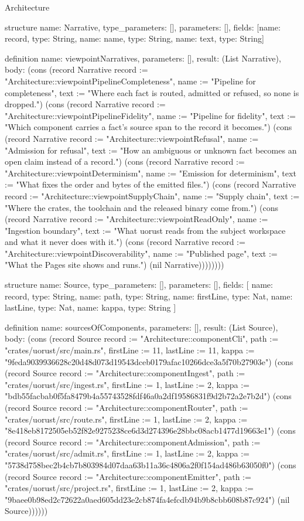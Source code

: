 \begin{lexlean}{Architecture}
\begin{semanticmodule}
structure{
  name: Narrative,
  type_parameters: [],
  parameters: [],
  fields: [{name: record, type: String}, {name: name, type: String}, {name: text, type: String}]
}

definition{
  name: viewpointNarratives,
  parameters: [],
  result: (List Narrative),
  body: (cons (record Narrative {record := "Architecture::viewpointPipelineCompleteness", name := "Pipeline for completeness", text := "Where each fact is routed, admitted or refused, so none is dropped."}) (cons (record Narrative {record := "Architecture::viewpointPipelineFidelity", name := "Pipeline for fidelity", text := "Which component carries a fact's source span to the record it becomes."}) (cons (record Narrative {record := "Architecture::viewpointRefusal", name := "Admission for refusal", text := "How an ambiguous or unknown fact becomes an open claim instead of a record."}) (cons (record Narrative {record := "Architecture::viewpointDeterminism", name := "Emission for determinism", text := "What fixes the order and bytes of the emitted files."}) (cons (record Narrative {record := "Architecture::viewpointSupplyChain", name := "Supply chain", text := "Where the crates, the toolchain and the released binary come from."}) (cons (record Narrative {record := "Architecture::viewpointReadOnly", name := "Ingestion boundary", text := "What uorust reads from the subject workspace and what it never does with it."}) (cons (record Narrative {record := "Architecture::viewpointDiscoverability", name := "Published page", text := "What the Pages site shows and runs."}) (nil Narrative))))))))
}

structure{
  name: Source,
  type_parameters: [],
  parameters: [],
  fields: [
    {name: record, type: String},
    {name: path, type: String},
    {name: firstLine, type: Nat},
    {name: lastLine, type: Nat},
    {name: kappa, type: String}
  ]
}

definition{
  name: sourcesOfComponents,
  parameters: [],
  result: (List Source),
  body: (cons (record Source {record := "Architecture::componentCli", path := "crates/uorust/src/main.rs", firstLine := 11, lastLine := 11, kappa := "9feda9039936628c20d48d073d19543dceb0179afac10266dce3a5f70b27903e"}) (cons (record Source {record := "Architecture::componentIngest", path := "crates/uorust/src/ingest.rs", firstLine := 1, lastLine := 2, kappa := "bdb55facbab0f5fa8479b4a55743528fdf46a0a2df19586831f9d2b72a2e7b2d"}) (cons (record Source {record := "Architecture::componentRouter", path := "crates/uorust/src/route.rs", firstLine := 1, lastLine := 2, kappa := "8e418eb8172505eb52f82e9275238ce6d3d274396e28bbc08acb1477d19663e1"}) (cons (record Source {record := "Architecture::componentAdmission", path := "crates/uorust/src/admit.rs", firstLine := 1, lastLine := 2, kappa := "5738d758bec2b4cb7b803984d07daa63b11a36c4806a2f0f154ad486b63050f0"}) (cons (record Source {record := "Architecture::componentEmitter", path := "crates/uorust/src/project.rs", firstLine := 1, lastLine := 2, kappa := "9baee0b98ed2c72622a0aed605dd23e2cb874fa4efcdb94b9b8cbb608b87c924"}) (nil Source))))))
}


\end{semanticmodule}
\end{lexlean}
